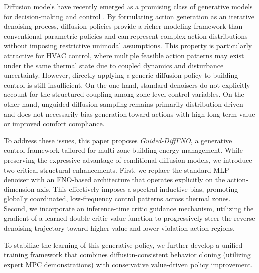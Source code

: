 \documentclass[lettersize,journal]{IEEEtran}
\theoremstyle{nonumberplain}     \theoremheaderfont{\bfseries\itshape}     \theorembodyfont{\normalfont}     \theoremseparator{:}     \theoremsymbol{\ensuremath{\blacksquare}}     \newtheorem{proof}{Proof}
\theoremstyle{plain}     \theoremheaderfont{\bfseries\itshape}     \theorembodyfont{\normalfont}     \theoremseparator{:}     \theoremsymbol{\ensuremath{\blacksquare}}     \newtheorem{remark}{Remark}
\begin{document}
Diffusion models have recently emerged as a promising class of generative models for decision-making and control \cite{chi2025diffusion,janner2022planning}. By formulating action generation as an iterative denoising process, diffusion policies provide a richer modeling framework than conventional parametric policies and can represent complex action distributions without imposing restrictive unimodal assumptions. This property is particularly attractive for HVAC control, where multiple feasible action patterns may exist under the same thermal state due to coupled dynamics and disturbance uncertainty. However, directly applying a generic diffusion policy to building control is still insufficient. On the one hand, standard denoisers do not explicitly account for the structured coupling among zone-level control variables. On the other hand, unguided diffusion sampling remains primarily distribution-driven and does not necessarily bias generation toward actions with high long-term value or improved comfort compliance.

To address these issues, this paper proposes \emph{Guided-DiffFNO}, a generative control framework tailored for multi-zone building energy management. While preserving the expressive advantage of conditional diffusion models, we introduce two critical structural enhancements. First, we replace the standard MLP denoiser with an FNO-based architecture that operates explicitly on the action-dimension axis. This effectively imposes a spectral inductive bias, promoting globally coordinated, low-frequency control patterns across thermal zones. Second, we incorporate an inference-time critic guidance mechanism, utilizing the gradient of a learned double-critic value function to progressively steer the reverse denoising trajectory toward higher-value and lower-violation action regions. 

To stabilize the learning of this generative policy, we further develop a unified training framework that combines diffusion-consistent behavior cloning (utilizing expert MPC demonstrations) with conservative value-driven policy improvement. 
\end{document}
